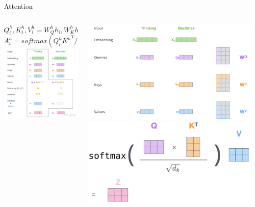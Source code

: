 \documentclass{beamer}
\begin{document}
\begin{frame}{Attention}
	\begin{columns}
		\begin{column}{0.5\textwidth}
			\footnotesize
			\centering
			$Q_i^h,K_i^h,V_i^h=W_Q^hh_i,W_K^hh_i,W_V^hh_i,$ \\
			$A_i^h=softmax(Q_i^h{K^h}^T/\sqrt{d_k})V_j^h$
			\includegraphics[width=\textwidth]{attention_cal.png}
		\end{column}
		\begin{column}{0.5\textwidth}
			\centering
			\includegraphics[width=\textwidth]{A1.png}
			\includegraphics[width=\textwidth]{A2.png}
		\end{column}
	\end{columns}
\end{frame}
\end{document}
